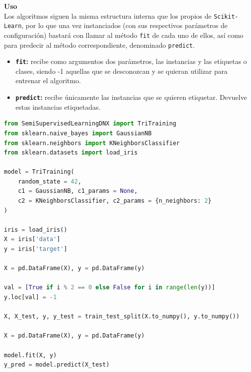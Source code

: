 \textbf{Uso}\\
Los algoritmos siguen la misma estructura interna que los propios de \texttt{Scikit-Learn}, por lo que una vez instanciados (con sus respectivos parámetros de configuración) bastará con llamar al método \texttt{fit} de cada uno de ellos, así como para predecir al método correspondiente, denominado \texttt{predict}.

\begin{itemize}
\item \textbf{\texttt{fit}:} recibe como argumentos dos parámetros, las instancias y las etiquetas o clases, siendo -1 aquellas que se desconozcan y se quieran utilizar para entrenar el algoritmo.
\item \textbf{\texttt{predict}:} recibe únicamente las instancias que se quieren etiquetar. Devuelve estas instancias etiquetadas.
\end{itemize}

\begin{lstlisting}[language=Python, caption={Ejemplo de uso de IS-SSL}, label={lst:ejemplossl}]
from SemiSupervisedLearningDNX import TriTraining
from sklearn.naive_bayes import GaussianNB
from sklearn.neighbors import KNeighborsClassifier
from sklearn.datasets import load_iris
	
model = TriTraining(
	random_state = 42,
	c1 = GaussianNB, c1_params = None,
	c2 = KNeighborsClassifier, c2_params = {n_neighbors: 2}
)
	
iris = load_iris()
X = iris['data']
y = iris['target']

X = pd.DataFrame(X), y = pd.DataFrame(y)
	
val = [True if i % 2 == 0 else False for i in range(len(y))]
y.loc[val] = -1

X, X_test, y, y_test = train_test_split(X.to_numpy(), y.to_numpy())

X = pd.DataFrame(X), y = pd.DataFrame(y)

model.fit(X, y)
y_pred = model.predict(X_test)
	
\end{lstlisting}
